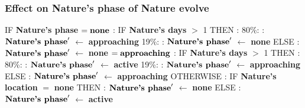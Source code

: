 \documentclass{article}%
\begin{document}
\subsubsection{Effect on Nature's phase of Nature evolve}%
\label{ssubsec:Effect on Nature's phase of Nature evolve}%
\begin{flushleft}%
IF %
\textbf{Nature's phase}%
\linebreak%
\hspace*{2em}%
$= \mbox{\textbf{none}}$%
: %
IF %
\textbf{Nature's days}%
$>$%
1%
\linebreak%
\hspace*{4em}%
THEN %
: %
\linebreak%
\hspace*{6em}%
80\%:%
: %
$\mbox{\textbf{Nature's phase}} '$%
$\leftarrow$%
\textbf{approaching}%
\linebreak%
\hspace*{6em}%
19\%:%
: %
$\mbox{\textbf{Nature's phase}} '$%
$\leftarrow$%
\textbf{none}%
\linebreak%
\hspace*{4em}%
ELSE %
: %
$\mbox{\textbf{Nature's phase}} '$%
$\leftarrow$%
\textbf{none}%
\linebreak%
\hspace*{2em}%
$= \mbox{\textbf{approaching}}$%
: %
IF %
\textbf{Nature's days}%
$>$%
1%
\linebreak%
\hspace*{4em}%
THEN %
: %
\linebreak%
\hspace*{6em}%
80\%:%
: %
$\mbox{\textbf{Nature's phase}} '$%
$\leftarrow$%
\textbf{active}%
\linebreak%
\hspace*{6em}%
19\%:%
: %
$\mbox{\textbf{Nature's phase}} '$%
$\leftarrow$%
\textbf{approaching}%
\linebreak%
\hspace*{4em}%
ELSE %
: %
$\mbox{\textbf{Nature's phase}} '$%
$\leftarrow$%
\textbf{approaching}%
\linebreak%
\hspace*{2em}%
OTHERWISE %
: %
IF %
\textbf{Nature's location}%
$=$%
\textbf{none}%
\linebreak%
\hspace*{4em}%
THEN %
: %
$\mbox{\textbf{Nature's phase}} '$%
$\leftarrow$%
\textbf{none}%
\linebreak%
\hspace*{4em}%
ELSE %
: %
$\mbox{\textbf{Nature's phase}} '$%
$\leftarrow$%
\textbf{active}%
\end{flushleft}
\end{document}
